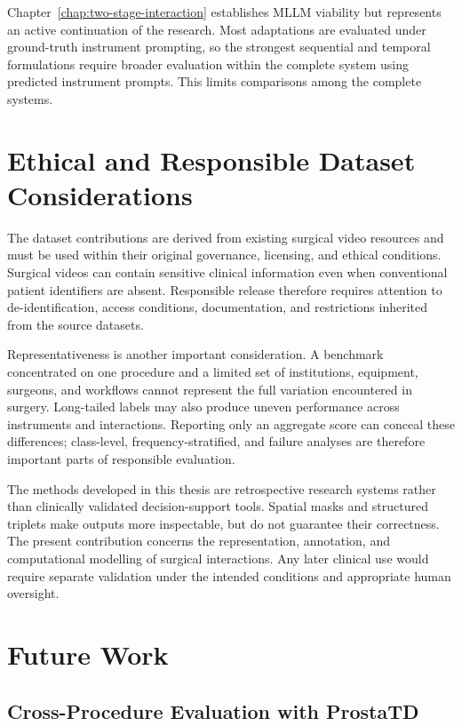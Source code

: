 Chapter~\ref{chap:two-stage-interaction} establishes MLLM viability but represents an active continuation of the research. Most adaptations are evaluated under ground-truth instrument prompting, so the strongest sequential and temporal formulations require broader evaluation within the complete system using predicted instrument prompts. This limits comparisons among the complete systems.

\section{Ethical and Responsible Dataset Considerations}
\label{sec:discussion-ethics}

The dataset contributions are derived from existing surgical video resources and must be used within their original governance, licensing, and ethical conditions. Surgical videos can contain sensitive clinical information even when conventional patient identifiers are absent. Responsible release therefore requires attention to de-identification, access conditions, documentation, and restrictions inherited from the source datasets.

Representativeness is another important consideration. A benchmark concentrated on one procedure and a limited set of institutions, equipment, surgeons, and workflows cannot represent the full variation encountered in surgery. Long-tailed labels may also produce uneven performance across instruments and interactions. Reporting only an aggregate score can conceal these differences; class-level, frequency-stratified, and failure analyses are therefore important parts of responsible evaluation.

The methods developed in this thesis are retrospective research systems rather than clinically validated decision-support tools. Spatial masks and structured triplets make outputs more inspectable, but do not guarantee their correctness. The present contribution concerns the representation, annotation, and computational modelling of surgical interactions. Any later clinical use would require separate validation under the intended conditions and appropriate human oversight.

\section{Future Work}
\label{sec:discussion-future-work}

\subsection{Cross-Procedure Evaluation with ProstaTD}
\label{sec:discussion-prostatd}

